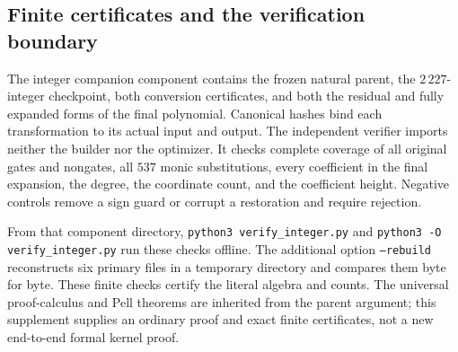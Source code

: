 \subsection{Finite certificates and the verification boundary}

The integer companion component contains the frozen natural parent,
the $2\,227$-integer checkpoint, both conversion certificates, and both
the residual and fully expanded forms of the final polynomial.
Canonical hashes bind each transformation to its actual input and output.
The independent verifier imports neither the builder nor the optimizer.
It checks complete coverage of all original gates and nongates, all $537$
monic substitutions, every coefficient in the final expansion, the degree,
the coordinate count, and the coefficient height.  Negative controls
remove a sign guard or corrupt a restoration and require rejection.

From that component directory, \texttt{python3 verify\_integer.py} and
\texttt{python3 -O verify\_integer.py} run these checks offline.
The additional option \texttt{--rebuild} reconstructs six primary files in
a temporary directory and compares them byte for byte.  These finite
checks certify the literal algebra and counts.  The universal
proof-calculus and Pell theorems are inherited from the parent argument;
this supplement supplies an ordinary proof and exact finite certificates,
not a new end-to-end formal kernel proof.
